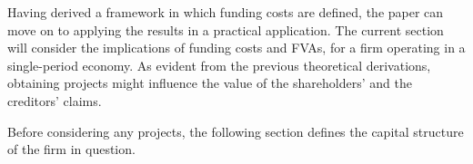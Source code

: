 \documentclass[main.tex]{subfiles}
\begin{document}
    Having derived a framework in which funding costs are defined, 
    the paper can move on to applying the results in a practical application.
    The current section will consider the implications of funding costs and FVAs,
    for a firm operating in a single-period economy.
    As evident from the previous theoretical derivations, 
    obtaining projects might influence the value of the shareholders' and the creditors' claims.

    Before considering any projects, 
    the following section defines the capital structure of the firm in question.
\end{document}
